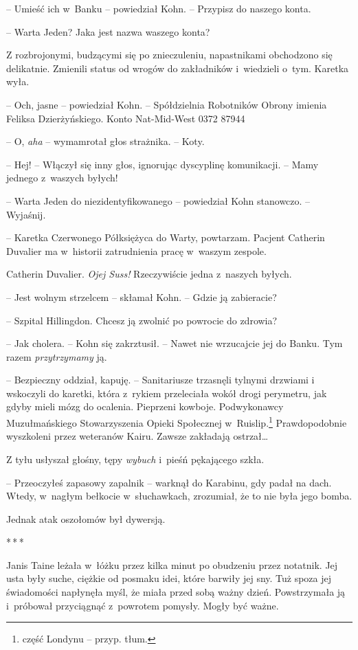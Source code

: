 \documentclass[oneside,polish,11pt,sfheadings]{mwbk}
\newcommand{\threeast}{\bigskip\par\centerline{*\,*\,*}\medskip\par}%
\begin{document}
-- Umieść ich w~Banku -- powiedział Kohn. -- Przypisz do naszego konta.

-- Warta Jeden? Jaka jest nazwa waszego konta?

Z rozbrojonymi, budzącymi się po znieczuleniu, napastnikami obchodzono
się delikatnie. Zmienili status od wrogów do zakładników i~wiedzieli o~tym. Karetka wyła.

-- Och, jasne -- powiedział Kohn. -- Spółdzielnia Robotników Obrony imienia
Feliksa Dzierżyńskiego. Konto Nat-Mid-West 0372 87944

-- O, \emph{aha} -- wymamrotał głos strażnika. -- Koty.

-- Hej! -- Włączył się inny głos, ignorując dyscyplinę komunikacji. -- Mamy
jednego z~waszych byłych!

-- Warta Jeden do niezidentyfikowanego -- powiedział Kohn stanowczo. --
Wyjaśnij.

-- Karetka Czerwonego Półksiężyca do Warty, powtarzam. Pacjent Catherin
Duvalier ma w~historii zatrudnienia pracę w~waszym zespole.

Catherin Duvalier. \emph{Ojej Suss!} Rzeczywiście jedna z~naszych
byłych.

-- Jest wolnym strzelcem -- skłamał Kohn. -- Gdzie ją zabieracie?

-- Szpital Hillingdon. Chcesz ją zwolnić po powrocie do zdrowia?

-- Jak cholera. -- Kohn się zakrztusił. -- Nawet nie wrzucajcie jej do
Banku. Tym razem \emph{przytrzymamy} ją.

-- Bezpieczny oddział, kapuję. -- Sanitariusze trzasnęli tylnymi drzwiami
i wskoczyli do karetki, która z~rykiem przeleciała wokół drogi
perymetru, jak gdyby mieli mózg do ocalenia. Pieprzeni kowboje.
Podwykonawcy Muzułmańskiego Stowarzyszenia Opieki Społecznej w~Ruislip.\footnote{część Londynu -- przyp. tłum.} Prawdopodobnie wyszkoleni
przez weteranów Kairu. Zawsze zakładają ostrzał\ldots

Z tyłu usłyszał głośny, tępy \emph{wybuch} i~pieśń pękającego szkła. 

-- Przeoczyłeś zapasowy zapalnik -- warknął do Karabinu, gdy padał na dach.
Wtedy, w~nagłym bełkocie w~słuchawkach, zrozumiał, że to nie była jego
bomba.

Jednak atak oszołomów był dywersją.

\threeast

Janis Taine leżała w~łóżku przez kilka minut po obudzeniu przez
notatnik. Jej usta były suche, ciężkie od posmaku idei, które barwiły
jej sny. Tuż spoza jej świadomości napłynęła myśl, że miała przed sobą
ważny dzień. Powstrzymała ją i~próbował przyciągnąć z~powrotem pomysły.
Mogły być ważne.
\end{document}
